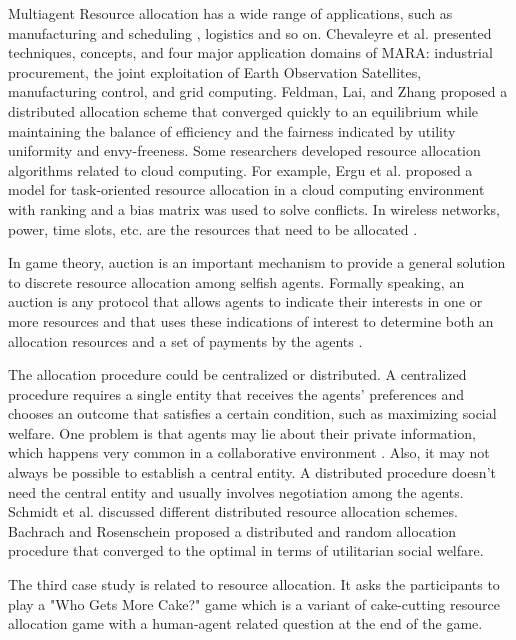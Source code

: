 Multiagent Resource allocation has a wide range of applications, such as manufacturing and scheduling \cite{lee2009} \cite{adhau2012}, logistics \cite{santos2003} and so on. Chevaleyre et al. \cite{chevaleyre2006} presented techniques, concepts, and four major application domains of MARA: industrial procurement, the joint exploitation of Earth Observation Satellites, manufacturing control, and grid computing. Feldman, Lai, and Zhang \cite{feldman2005} proposed a distributed allocation scheme that converged quickly to an equilibrium while maintaining the balance of efficiency and the fairness indicated by utility uniformity and envy-freeness. Some researchers developed resource allocation algorithms related to cloud computing. For example, Ergu et al. \cite{ergu2013} proposed a model for task-oriented resource allocation in a cloud computing environment with ranking and a bias matrix was used to solve conflicts. In wireless networks, power, time slots, etc. are the resources that need to be allocated \cite{eryilmaz2007} \cite{altman2010} \cite{wang2011}.   

In game theory, auction is an important mechanism to provide a general solution to discrete resource allocation among selfish agents. Formally speaking, an auction is any protocol that allows agents to indicate their interests in one or more resources and that uses these indications of interest to determine both an allocation  resources and a set of payments by the agents \cite{shoham2008}.

The allocation procedure could be centralized or distributed. A centralized procedure requires a single entity that receives the agents' preferences and chooses an outcome that satisfies a certain condition, such as maximizing social welfare. One problem is that agents may lie about their private information, which happens very common in a collaborative environment \cite{malik2012} \cite{malik2010}. Also, it may not always be possible to establish a central entity. A distributed procedure doesn't need the central entity and usually involves negotiation among the agents. Schmidt et al. \cite{schmidt2009} discussed different distributed resource allocation schemes. Bachrach and Rosenschein \cite{bachrach2008} proposed a distributed and random allocation procedure that converged to the optimal in terms of utilitarian social welfare.

The third case study is related to resource allocation. It asks the participants to play a "Who Gets More Cake?" game which is a variant of cake-cutting resource allocation game with a human-agent related question at the end of the game. 

